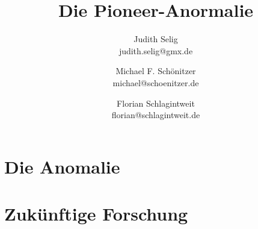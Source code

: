 \documentclass[a4paper,10pt]{article}
\title{Die Pioneer-Anormalie}
\author{Judith Selig\\judith.selig@gmx.de \and Michael F. Schönitzer\\michael@schoenitzer.de \and Florian Schlagintweit\\florian@schlagintweit.de}	%
\begin{document}
\maketitle






\section{Die Anomalie}





\bigskip
\bigskip

\section{Zukünftige Forschung}



\bigskip




{}

\end{document}
